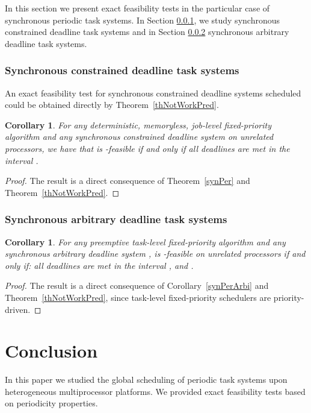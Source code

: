 \documentclass[a4paper,11pt]{article}
\newtheorem{Corollary}[Theorem]{Corollary}
\begin{document}
In this section we present exact feasibility tests in the particular
case of synchronous periodic task systems. In Section
\ref{labelSectFebSynch1}, we study synchronous constrained deadline
task systems and in Section \ref{labelSectFebSynch2} synchronous
arbitrary deadline task systems.

\subsubsection{Synchronous constrained deadline task
  systems} \label{labelSectFebSynch1}

An exact feasibility test for synchronous constrained deadline systems
scheduled could be obtained directly by Theorem~\ref{thNotWorkPred}.

\begin{Corollary}\label{fixIdent2} For any deterministic, memoryless,
  job-level fixed-priority algorithm  and any synchronous constrained deadline system  on  unrelated processors, we have that  is -feasible if and only if all
  deadlines are met in the interval .
\end{Corollary}

\begin{proof}
  The result is a direct consequence of Theorem~\ref{synPer} and
  Theorem~\ref{thNotWorkPred}.
\end{proof}



\subsubsection{Synchronous arbitrary deadline task
  systems} \label{labelSectFebSynch2}

\begin{Corollary}\label{fixIdent2bis} For any preemptive task-level fixed-priority
  algorithm  and any synchronous arbitrary deadline system ,
   is -feasible on  unrelated processors if and only if: all deadlines are met in the interval , and . 
\end{Corollary}

\begin{proof}
  The result is a direct consequence of Corollary~\ref{synPerArbi} and
  Theorem~\ref{thNotWorkPred}, since task-level fixed-priority schedulers are
  priority-driven.
\end{proof}

\section{Conclusion} \label{conclusion}
In this paper we studied the global scheduling of periodic task systems upon heterogeneous multiprocessor platforms. We provided exact feasibility tests based on periodicity properties. 
\end{document}
